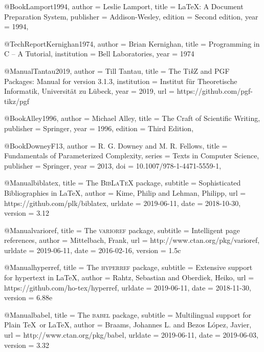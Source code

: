 \documentclass[german,version-2020-11]{uzl-thesis}
\begin{document}
\begin{itemize}
\begin{bibtex-entries}
@Book{Lamport1994,
  author =       {Leslie Lamport},
  title =        {\LaTeX: A Document Preparation System},
  publisher =    {Addison-Wesley},
  edition =      {Second edition},
  year =         {1994},
}

@TechReport{Kernighan1974,
  author =       {Brian Kernighan},
  title =        {Programming in C – A Tutorial},
  institution =  {Bell Laboratories},
  year =         {1974}
}

@Manual{Tantau2019,
  author =       {Till Tantau},
  title =        {The Ti\emph kZ and PGF Packages: Manual for version 3.1.3},
  institution =  {Institut für Theoretische Informatik, Universität zu Lübeck},
  year =         {2019},
  url =          {https://github.com/pgf-tikz/pgf}
}

@Book{Alley1996,
  author =       {Michael Alley},
  title =        {The Craft of Scientific Writing},
  publisher =    {Springer},
  year =         {1996},
  edition =      {Third Edition},
}

@Book{DowneyF13,
  author =       {R. G. Downey and M. R. Fellows},
  title =        {Fundamentals of Parameterized Complexity},
  series =       {Texts in Computer Science},
  publisher =    {Springer},
  year =         2013,
  doi =          {10.1007/978-1-4471-5559-1},
}

@Manual{biblatex,
  title =        {The \textsc{BibLaTeX} package},
  subtitle =     {Sophisticated Bibliographies in \LaTeX},
  author =       {Kime, Philip and Lehman, Philipp},
  url =          {https://github.com/plk/biblatex},
  urldate =      {2019-06-11},
  date =         {2018-10-30},
  version =      {3.12}
}

@Manual{varioref,
  title =        {The \textsc{varioref} package},
  subtitle =     {Intelligent page references},
  author =       {Mittelbach, Frank},
  url =          {http://www.ctan.org/pkg/varioref},
  urldate =      {2019-06-11},
  date =         {2016-02-16},
  version =      {1.5c}
}

@Manual{hyperref,
  title =        {The \textsc{hyperref} package},
  subtitle =     {Extensive support for hypertext in \LaTeX},
  author =       {Rahtz, Sebastian and Oberdiek, Heiko},
  url =          {https://github.com/ho-tex/hyperref},
  urldate =      {2019-06-11},
  date =         {2018-11-30},
  version =      {6.88e}
}

@Manual{babel,
  title =        {The \textsc{babel} package},
  subtitle =     {Multilingual support for Plain \TeX\ or \LaTeX},
  author =       {Braams, Johannes L. and Bezos López, Javier},
  url =          {http://www.ctan.org/pkg/babel},
  urldate =      {2019-06-11},
  date =         {2019-06-03},
  version =      {3.32}
}


\end{bibtex-entries}
\end{itemize}
\end{document}
